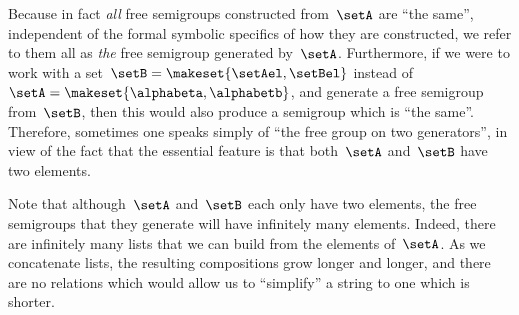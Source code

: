 Because in fact \emph{all} free semigroups constructed from~$\setA$ are ``the same'', independent of the formal symbolic specifics of how they are constructed, we refer to them all as \emph{the} free semigroup generated by~$\setA$.
Furthermore, if we were to work with a set~$\setB = \makeset{ \setAel, \setBel }$ instead of~$\setA = \makeset{ \alphabeta, \alphabetb}$, and generate a free semigroup from~$\setB$, then this would also produce a semigroup which is ``the same''.
Therefore, sometimes one speaks simply of ``the free group on two generators'', in view of the fact that the essential feature is that both~$\setA$ and~$\setB$ have two elements.

Note that although~$\setA$ and~$\setB$ each only have two elements, the free semigroups that they generate will have infinitely many elements.
Indeed, there are infinitely many lists that we can build from the elements of~$\setA$.
As we concatenate lists, the resulting compositions grow longer and longer, and there are no relations which would allow us to ``simplify'' a string to one which is shorter.

